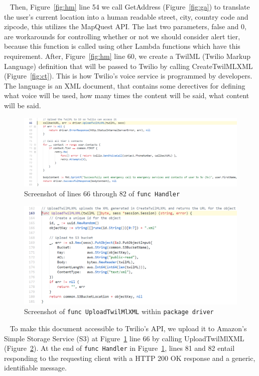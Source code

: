 \documentclass[10pt, a4paper]{article}
\begin{document}
\par ~ Then, Figure~\ref{fig:hm} line 54 we call GetAddress (Figure~\ref{fig:ga}) to translate the user's current location into a human readable street, city, country code and zipcode, this utilizes the MapQuest API. The last two parameters, false and 0, are workarounds for controlling whether or not we should consider alert tier, because this function is called using other Lambda functions which have this requirement. After, Figure~\ref{fig:hm} line 60, we create a TwilML (Twilio Markup Language) definition that will be passed to Twilio by calling CreateTwilMLXML (Figure~\ref{fig:ct}). This is how Twilio's voice service is programmed by developers. The language is an XML document, that contains some derectives for defining what voice will be used, how many times the content will be said, what content will be said. 

\begin{figure}[H]
  \includegraphics[scale=.6]{code-screenshots/handler-66-82.PNG}
  \caption{Screenshot of lines 66 through 82 of \texttt{func Handler}}\label{fig:hmtwo}
\end{figure}

\begin{figure}[H]
  \includegraphics[scale=.7]{code-screenshots/upload-twilml.PNG}
  \caption{Screenshot of \texttt{func UploadTwilMlXML} within \texttt{package driver}}\label{fig:ut}
\end{figure}

\par ~ To make this document accessible to Twilio's API, we upload it to Amazon's Simple Storage Service (S3) at Figure~\ref{fig:hmtwo} line 66 by calling UploadTwilMlXML (Figure~\ref{fig:ut}). At the end of \texttt{func Handler} in Figure~\ref{fig:hmtwo}, lines 81 and 82 entail responding to the requesting client with a HTTP 200 OK response and a generic, identifiable message.
\end{document}
